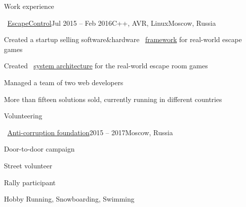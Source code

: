 \documentclass{resume} %
\begin{document}
\begin{rSection}{Work experience}

\begin{rSubsection}{\faExternalLink~\href{http://escapecontrol.ru/index_en.html}{EscapeControl}}{Jul 2015 -- Feb 2016}{C++, AVR, Linux}{Moscow, Russia}
	\item Created a startup selling software\&hardware \faExternalLink~\href{http://demo:demo@ec3.pagekite.escapecontrol.ru}{framework} for real-world escape games
	\item Created \faExternalLink~\href{http://habr.ru/p/258585/}{system architecture} for the real-world escape room games
	\item Managed a team of two web developers
	\item More than fifteen solutions sold, currently running in different countries
\end{rSubsection}


		
\end{rSection}

\begin{rSection}{Volunteering}
	\begin{rSubsection}{\faExternalLink~\href{https://fbk.info/english/about/}{Anti-corruption foundation}}{2015 -- 2017}{Moscow, Russia}{}
		\item Door-to-door campaign
		\item Street volunteer
		\item Rally participant
	\end{rSubsection}
\end{rSection}

\begin{rSection}{Hobby}
Running, Snowboarding, Swimming
\end{rSection}
\end{document}
